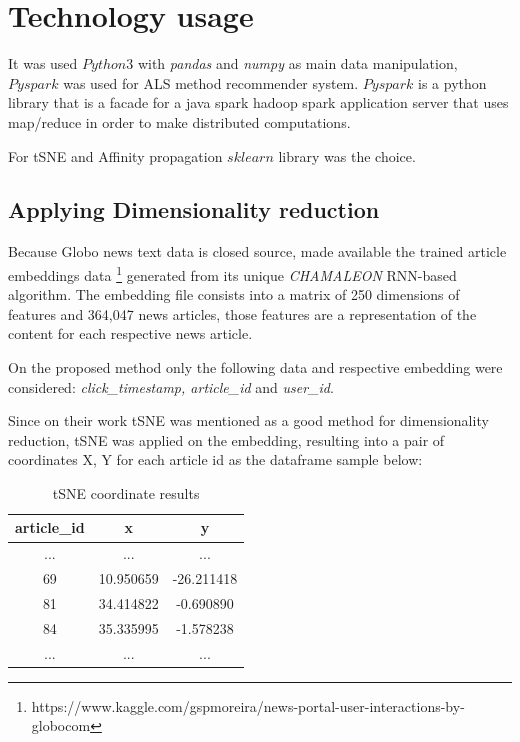 \documentclass[ecp,tc,english]{iiufrgs}
\begin{document}
    \section{Technology usage}

    It was used \(Python3\) with \textit{pandas} \cite{reback2020pandas} and \textit{numpy} as main data manipulation, \(Pyspark\) was used for ALS method recommender system. 
    \(Pyspark\) is a python library that is a facade for a java spark hadoop spark application server that uses map/reduce in order to make distributed computations.

    For tSNE and Affinity propagation \(sklearn\) library was the choice.
        
        \subsection{Applying Dimensionality reduction}
        Because Globo news text data is closed source, \cite{deSouzaPereiraMoreira:2018:CDL:3240323.3240331} made available the trained article embeddings data \footnote{https://www.kaggle.com/gspmoreira/news-portal-user-interactions-by-globocom} generated from its unique \textit{CHAMALEON} RNN-based algorithm. The embedding file consists into a matrix of 250 dimensions of features and 364,047 news articles, those features are a representation of the content for each respective news article.
    
        On the proposed method only the following data and respective embedding were considered: \textit{click\_timestamp, article\_id} and \textit{{}user\_id}.
        
    
        Since on their work tSNE was mentioned as a good method for dimensionality reduction, tSNE was applied on the embedding, resulting into a pair of coordinates X, Y for each article id as the dataframe sample below:
        
        \begin{table}[!ht]
            \centering
            \begin{tabular}{ |c|c|c| } 
                \hline
                article\_id & x & y \\
                \hline 
                ... & ... & ... \\
                69 & 10.950659 & -26.211418 \\ 
                81 & 34.414822 & -0.690890 \\ 
                84 & 35.335995 & -1.578238 \\ 
                ... & ... & ... \\
                \hline
            \end{tabular}
            \caption{tSNE coordinate results}
            \label{tab:tsne_results}
        \end{table}
        
\end{document}
